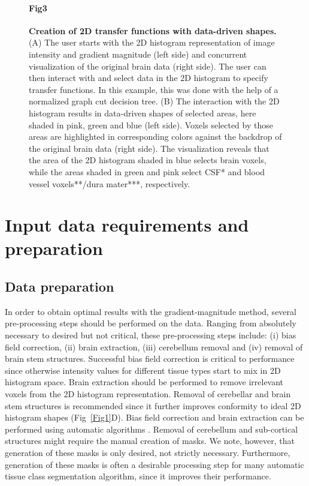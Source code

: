 \begin{figure}[!ht]
\paragraph{Fig3}
\caption{{\bf Creation of 2D transfer functions with data-driven shapes.} (A) The user starts with the 2D histogram representation of image intensity and gradient magnitude (left side) and concurrent visualization of the original brain data (right side). The user can then interact with and select data in the 2D histogram to specify transfer functions. In this example, this was done with the help of a normalized graph cut decision tree. (B) The interaction with the 2D histogram results in data-driven shapes of selected areas, here shaded in pink, green and blue (left side). Voxels selected by those areas are highlighted in corresponding colors against the backdrop of the original brain data (right side). The visualization reveals that the area of the 2D histogram shaded in blue selects brain voxels, while the areas shaded in green and pink select CSF* and blood vessel voxels**/dura mater***, respectively.}
\label{Fig3}
\end{figure}

\section{Input data requirements and preparation} \label{DataRequirements}

\subsection{Data preparation}
In order to obtain optimal results with the gradient-magnitude method, several pre-processing steps should be performed on the data. Ranging from absolutely necessary to desired but not critical, these pre-processing steps include: (i) bias field correction, (ii) brain extraction, (iii) cerebellum removal and (iv) removal of brain stem structures. Successful bias field correction is critical to performance since otherwise intensity values for different tissue types start to mix in 2D histogram space. Brain extraction should be performed to remove irrelevant voxels from the 2D histogram representation. Removal of cerebellar and brain stem structures is recommended since it further improves conformity to ideal 2D histogram shapes (Fig~\ref{Fig1}D). Bias field correction and brain extraction can be performed using automatic algorithms \cite{Smith2002, Ashburner2005}. Removal of cerebellum and sub-cortical structures might require the manual creation of masks. We note, however, that generation of these masks is only desired, not strictly necessary. Furthermore, generation of these masks is often a desirable processing step for many automatic tissue class segmentation algorithm, since it improves their performance.

